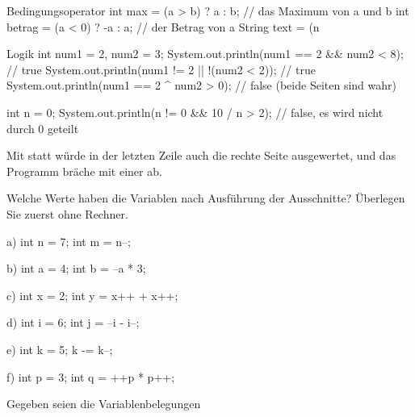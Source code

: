 \begin{javacode}[Ausschnitt]{Bedingungsoperator}
int max = (a > b) ? a : b;                 // das Maximum von a und b
int betrag = (a < 0) ? -a : a;             // der Betrag von a
String text = (n %
\end{javacode}

\begin{javacode}[Ausschnitt]{Logik}
int num1 = 2, num2 = 3;
System.out.println(num1 == 2 && num2 < 8);          // true
System.out.println(num1 != 2 || !(num2 < 2));       // true
System.out.println(num1 == 2 ^ num2 > 0);           // false (beide Seiten sind wahr)

int n = 0;
System.out.println(n != 0 && 10 / n > 2);           // false, es wird nicht durch 0 geteilt
\end{javacode}
Mit \code{\&} statt \code{\&\&} würde in der letzten Zeile auch die rechte Seite ausgewertet, und das Programm bräche mit einer  ab.

\aufgaben
{}
Welche Werte haben die Variablen nach Ausführung der Ausschnitte? Überlegen Sie zuerst ohne Rechner.
\begin{tcbraster}[raster columns=3, raster equal height=rows, raster column skip=3mm, raster row skip=1mm]
\begin{javacode}[Ausschnitt]{a)}
int n = 7;
int m = n--;
\end{javacode}
\begin{javacode}[Ausschnitt]{b)}
int a = 4;
int b = --a * 3;
\end{javacode}
\begin{javacode}[Ausschnitt]{c)}
int x = 2;
int y = x++ + x++;
\end{javacode}
\begin{javacode}[Ausschnitt]{d)}
int i = 6;
int j = --i - i--;
\end{javacode}
\begin{javacode}[Ausschnitt]{e)}
int k = 5;
k -= k--;
\end{javacode}
\begin{javacode}[Ausschnitt]{f)}
int p = 3;
int q = ++p * p++;
\end{javacode}
\end{tcbraster}

Gegeben seien die Variablenbelegungen 

